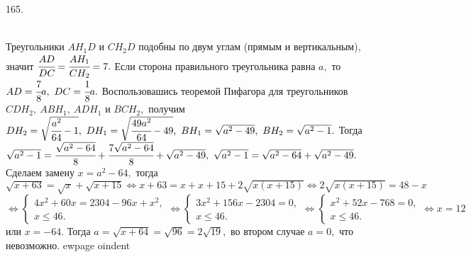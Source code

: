 165. \begin{figure}[ht!]
\end{figure}\\
Треугольники $AH_1D$ и $CH_2D$ подобны по двум углам (прямым и вертикальным), значит $\cfrac{AD}{DC}=\cfrac{AH_1}{CH_2}=7.$ Если сторона правильного треугольника равна $a,$ то $AD=\cfrac{7}{8}a,\ DC=\cfrac{1}{8}a.$ Воспользовашись теоремой Пифагора для треугольников $CDH_2,\ ABH_1,\ ADH_1$ и $BCH_2,$ получим $DH_2=\sqrt{\cfrac{a^2}{64}-1},\ DH_1=\sqrt{\cfrac{49a^2}{64}-49},\ BH_1=\sqrt{a^2-49},\ BH_2=\sqrt{a^2-1}.$ Тогда
$\sqrt{a^2-1}=\cfrac{\sqrt{a^2-64}}{8}+\cfrac{7\sqrt{a^2-64}}{8}+\sqrt{a^2-49},\
\sqrt{a^2-1}=\sqrt{a^2-64}+\sqrt{a^2-49}.$ Сделаем замену $x=a^2-64,$ тогда $\sqrt{x+63}=\sqrt{x}+\sqrt{x+15}\Leftrightarrow x+63=x+x+15+2\sqrt{x(x+15)}\Leftrightarrow 2\sqrt{x(x+15)}=48-x$\\$ \Leftrightarrow \begin{cases} 4x^2+60x=2304-96x+x^2,\\ x\leqslant 46.\end{cases}
\Leftrightarrow \begin{cases} 3x^2+156x-2304=0,\\ x\leqslant 46.\end{cases}
\Leftrightarrow \begin{cases} x^2+52x-768=0,\\ x\leqslant 46.\end{cases}\Leftrightarrow x=12$ или $x=-64.$
Тогда $a=\sqrt{x+64}=\sqrt{96}=2\sqrt{19},$ во втором случае $a=0,$ что невозможно.
ewpage
oindent
